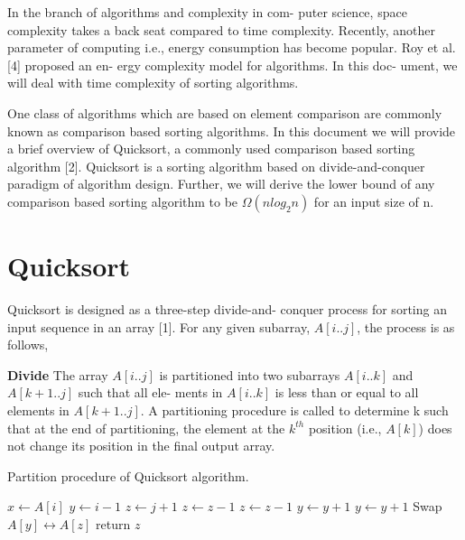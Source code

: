 \documentclass[a4paper, 10pt,twocolumn]{article}
\begin{document}
\noindent In the branch of algorithms and complexity in com-
puter science, space complexity takes a back seat
compared to time complexity. Recently, another
parameter of computing i.e., energy consumption
has become popular. Roy et al. [4] proposed an en-
ergy complexity model for algorithms. In this doc-
ument, we will deal with time complexity of sorting
algorithms.

One class of algorithms which are based on element comparison are commonly known
as comparison based sorting algorithms. In this document we
will provide a brief overview of Quicksort, a commonly
used comparison based sorting algorithm [2]. Quicksort
is a sorting algorithm based on divide-and-conquer
paradigm of algorithm design. Further,
we will derive the lower bound of any comparison based
sorting algorithm to be $\Omega(nlog_{2}n)$ for an input size of n.


\section{Quicksort}

Quicksort is designed as a three-step divide-and-
conquer process for sorting an input sequence in
an array [1]. For any given subarray, $A[i..j]$, the
process is as follows,

\textbf{Divide} The array $A[i..j]$ is partitioned into two
subarrays $A[i..k]$ and $A[k + 1..j]$ such that all ele-
ments in $A[i..k]$ is less than or equal to all elements
in $A[k + 1..j]$. A partitioning procedure is called to
determine k such that at the end of partitioning, the element at the $k^{th}$
position (i.e., $A[k]$) does not change its position in the final output array.

\begin{algorithm}
\caption{Partition procedure of Quicksort algorithm.}
\begin{algorithmic}[1]
     \newline
      \newline
      \State $x \leftarrow A[i]$
	\State $y \leftarrow i-1$
	\State $z \leftarrow j+1$
	 \State $z \leftarrow z-1$
           \State $z \leftarrow z-1$ 
	  \EndWhile 
	  \State $y \leftarrow y+1$
	  \State $y \leftarrow y+1$
	\EndWhile
	    \State Swap $A[y] \leftrightarrow A[z]$ 
	\Else
 	   \State return $z$ 
	\EndIf
      \EndWhile
     \EndProcedure 
  \end{algorithmic}
\end{algorithm}
\end{document}
